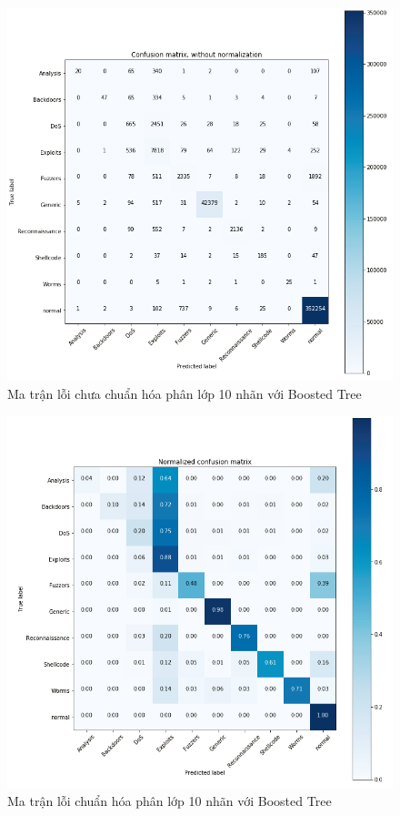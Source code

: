 \begin{figure}[H]
    \centering
    \includegraphics[scale=0.8]{confusion_10_no_norm}
    \caption{Ma trận lỗi chưa chuẩn hóa phân lớp 10 nhãn với Boosted Tree}
    \label{}
\end{figure}
\begin{figure}[H]
    \centering
    \includegraphics[scale=0.8]{confusion_10_norm}
    \caption{Ma trận lỗi chuẩn hóa phân lớp 10 nhãn với Boosted Tree}
    \label{}
\end{figure}

